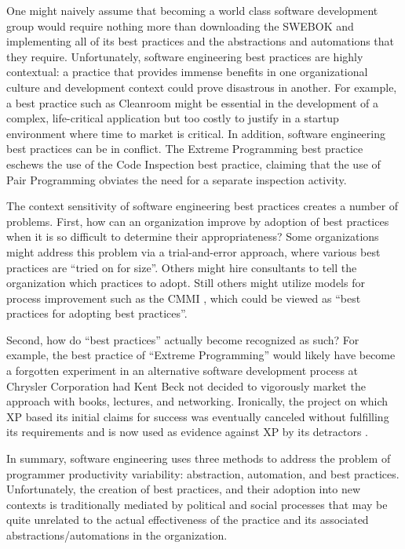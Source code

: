 One might naively assume that becoming a world class software development
group would require nothing more than downloading the SWEBOK and
implementing all of its best practices and the abstractions and automations
that they require.  Unfortunately, software engineering best practices are
highly contextual: a practice that provides immense benefits in one
organizational culture and development context could prove disastrous in
another. For example, a best practice such as Cleanroom might be essential
in the development of a complex, life-critical application but too costly
to justify in a startup environment where time to market is critical.  In
addition, software engineering best practices can be in conflict.  The
Extreme Programming \cite{Beck00} best practice eschews the use of the Code
Inspection \cite{Fagan76} best practice, claiming that the use of Pair
Programming obviates the need for a separate inspection activity.

The context sensitivity of software engineering best practices creates a
number of problems. First, how can an organization improve by adoption of
best practices when it is so difficult to determine their appropriateness?
Some organizations might address this problem via a trial-and-error
approach, where various best practices are ``tried on for size''.  Others
might hire consultants to tell the organization which practices to
adopt. Still others might utilize models for process improvement such as
the CMMI \cite{Royce02}, which could be viewed as ``best practices for
adopting best practices''.

Second, how do ``best practices'' actually become recognized as such?  For
example, the best practice of ``Extreme Programming'' would likely have
become a forgotten experiment in an alternative software development
process at Chrysler Corporation had Kent Beck not decided to vigorously
market the approach with books, lectures, and networking.  Ironically, the
project on which XP based its initial claims for success was eventually
canceled without fulfilling its requirements and is now used as evidence
against XP by its detractors \cite{Keefer03}.

In summary, software engineering uses three methods to address the problem
of programmer productivity variability: abstraction, automation, and best
practices.  Unfortunately, the creation of best practices, and their
adoption into new contexts is traditionally mediated by political and
social processes that may be quite unrelated to the actual effectiveness of
the practice and its associated abstractions/automations in the 
organization.


